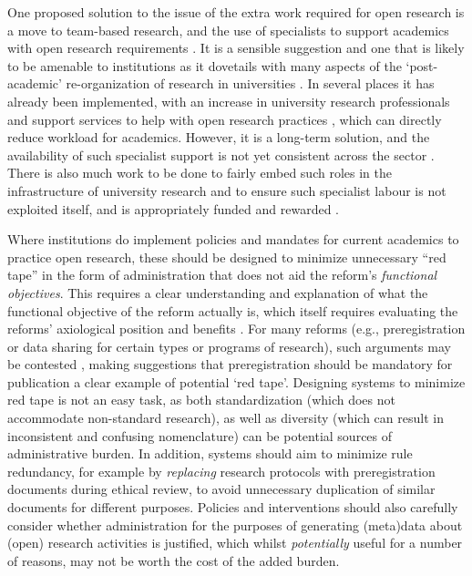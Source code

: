 \documentclass[ authordate, meta, issue]{jote-new-article}
\begin{document}
One proposed solution to the issue of the extra work required for open research is a move to team-based research, and the use of specialists to support academics with open research requirements \parencites{Stewart2021}. It is a sensible suggestion and one that is likely to be amenable to institutions as it dovetails with many aspects of the ‘post-academic’ re-organization of research in universities \parencites{Ziman2000}. In several places it has already been implemented, with an increase in university research professionals and support services to help with open research practices \parencites{Carter2019}, which can directly reduce workload for academics. However, it is a long-term solution, and the availability of such specialist support is not yet consistent across the sector \parencites{Stewart2022}. There is also much work to be done to fairly embed such roles in the infrastructure of university research and to ensure such specialist labour is not exploited itself, and is appropriately funded and rewarded \parencites{Bennett2022}.



Where institutions do implement policies and mandates for current academics to practice open research, these should be designed to minimize unnecessary “red tape” in the form of administration that does not aid the reform’s \emph{functional objectives}. This requires a clear understanding and explanation of what the functional objective of the reform actually is, which itself requires evaluating the reforms’ axiological position and benefits \parencites{UygunTunç2022}. For many reforms (e.g., preregistration or data sharing for certain types or programs of research), such arguments may be contested \parencites[e.g.,][]{Szollosi2020}, making suggestions that preregistration should be mandatory for publication \parencites{Aguinis2020} a clear example of potential ‘red tape’. Designing systems to minimize red tape is not an easy task, as both standardization (which does not accommodate non-standard research), as well as diversity (which can result in inconsistent and confusing nomenclature) can be potential sources of administrative burden. In addition, systems should aim to minimize rule redundancy, for example by \emph{replacing} research protocols with preregistration documents during ethical review, to avoid unnecessary duplication of similar documents for different purposes. Policies and interventions should also carefully consider whether administration for the purposes of generating (meta)data about (open) research activities is justified, which whilst \emph{potentially} useful for a number of reasons, may not be worth the cost of the added burden.
\end{document}
